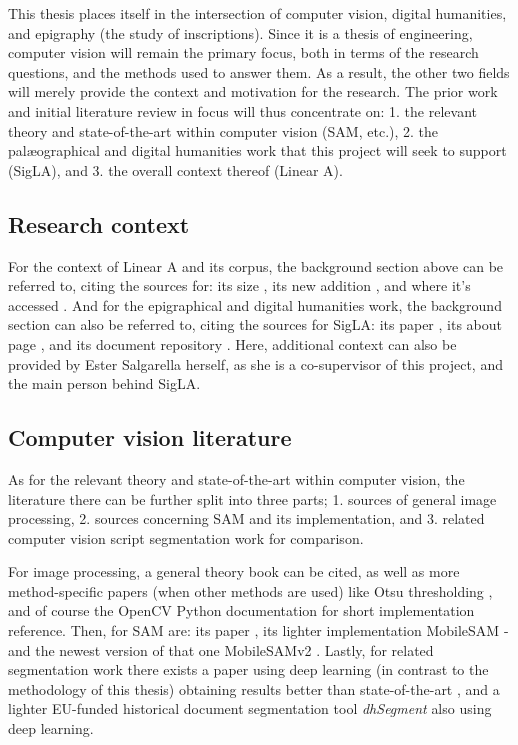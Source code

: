 \noindent

This thesis places itself in the intersection of computer vision, digital humanities, and epigraphy (the study of inscriptions).
Since it is a thesis of engineering, computer vision will remain the primary focus, both in terms of the research questions, and the methods used to answer them.
As a result, the other two fields will merely provide the context and motivation for the research.
The prior work and initial literature review in focus will thus concentrate on: 1. the relevant theory and state-of-the-art within computer vision (\acs{SAM}, etc.),
2. the palæographical and digital humanities work that this project will seek to support (SigLA),
and 3. the overall context thereof (Linear A).

\subsection{Research context}

For the context of Linear A and its corpus, the background section above can be referred to, citing the sources for: its size \parencite{SteeleAegeanWriting2023}, its new addition \parencite{CNRLinearACorpus2025}, and where it's accessed \parencite{EtudesCretoises21}.
And for the epigraphical and digital humanities work, the background section can also be referred to, citing the sources for SigLA: its paper \parencite{SalgarellaCastellanSigLA2020}, its about page \parencite{SigLAAboutPage}, and its document repository \parencite{SigLASearchDocuments}.
Here, additional context can also be provided by Ester Salgarella herself, as she is a co-supervisor of this project, and the main person behind SigLA.

\subsection{Computer vision literature}

As for the relevant theory and state-of-the-art within computer vision, the literature there can be further split into three parts;
1. sources of general image processing,
2. sources concerning SAM and its implementation,
and 3. related computer vision script segmentation work for comparison.

For image processing, a general theory book \parencite{DigitalImageProcessing} can be cited, as well as more method-specific papers (when other methods are used) like Otsu thresholding \parencite{Otsu1979}, and of course the OpenCV Python documentation \parencite{opencv_imgproc_docs} for short implementation reference.
Then, for \acs{SAM} are: its paper \parencite{sam}, its lighter implementation MobileSAM \parencite{mobile_sam} - and the newest version of that one MobileSAMv2 \parencite{mobile_sam_v2}.
Lastly, for related segmentation work there exists a paper using deep learning (in contrast to the methodology of this thesis) obtaining results better than state-of-the-art \parencite{DeepLearningSegmentation}, and a lighter EU-funded historical document segmentation tool \textit{dhSegment} \parencite{dhsegment} also using deep learning.


